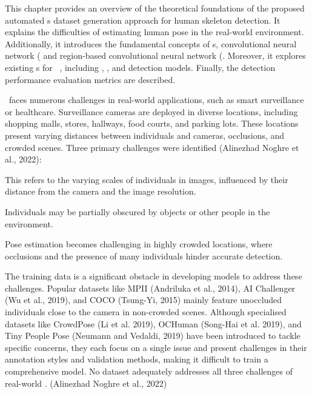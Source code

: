 This chapter provides an overview of the theoretical foundations of the proposed automated \NN\-s dataset generation approach for human skeleton detection. It explains the difficulties of estimating human pose in the real-world environment. Additionally, it introduces the fundamental concepts of \NN\-s, convolutional neural network (\CNN\) and region-based convolutional neural network (\RCNN\). Moreover, it explores existing \NN\-s for \HPE\ , including , , and  detection models. Finally, the detection performance evaluation metrics are described.

\HPE\ faces numerous challenges in real-world applications, such as smart surveillance or healthcare. Surveillance cameras are de\-ployed in diverse locations, including shopping malls, stores, hallways, food courts, and parking lots. These locations present varying distances between individuals and cameras, occlusions, and crowded scenes. Three primary challenges were identified (\scc Alinezhad Noghre et al., 2022):

\startitemize[n]
 \item {} This refers to the varying scales of individuals in images, influenced by their distance from the camera and the image resolution.
 \item {} Individuals may be partially obscured by objects or other people in the environment.
 \item {} Pose estimation becomes challenging in highly crowd\-ed locations, where occlusions and the presence of many individuals hinder accurate detection.
\stopitemize

The training data is a significant obstacle in developing models to address these challenges. Popular datasets like MPII (\scc Andriluka et al., 2014), AI Challenger (\scc Wu et al., 2019), and COCO (\scc Tsung-Yi, 2015) mainly feature unoccluded individuals close to the camera in non-crowded scenes. Although specialised datasets like CrowdPose (\scc Li et al. 2019), OCHuman (\scc Song-Hai et al. 2019), and Tiny People Pose (\scc Neumann and Vedaldi, 2019) have been introduced to tackle specific concerns, they each focus on a single issue and present challenges in their annotation styles and validation methods, making it difficult to train a comprehensive model. No dataset adequately addresses all three challenges of real-world \HPE. (\scc Alinezhad Noghre et al., 2022)

